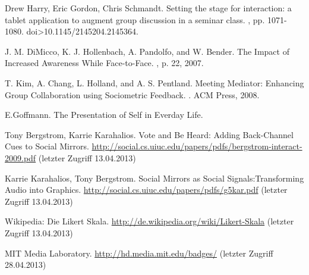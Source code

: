 \documentclass{seminarvorlage}
\begin{document}
\begin{thebibliography}{1}

Drew Harry, Eric Gordon, Chris Schmandt.
\newblock Setting the stage for interaction: a tablet application to augment group discussion in a seminar class. 
, pp. 1071-1080. doi>10.1145/2145204.2145364. 

J. M. DiMicco, K. J. Hollenbach, A. Pandolfo, and W. Bender.
\newblock The Impact of Increased Awareness While Face-to-Face.
, p. 22, 2007.

T. Kim, A. Chang, L. Holland, and A. S. Pentland.
\newblock Meeting Mediator: Enhancing Group Collaboration using Sociometric Feedback. 
. ACM Press, 2008.

E.Goffmann.
\newblock The Presentation of Self in Everday Life.

Tony Bergstrom, Karrie Karahalios. 
\newblock Vote and Be Heard: Adding Back-Channel Cues to Social Mirrors.
 \url {http://social.cs.uiuc.edu/papers/pdfs/bergstrom-interact-2009.pdf} (letzter Zugriff 13.04.2013)

Karrie Karahalios, Tony Bergstrom. 
\newblock Social Mirrors as Social Signals:Transforming Audio into Graphics.
 \url {http://social.cs.uiuc.edu/papers/pdfs/g5kar.pdf} (letzter Zugriff 13.04.2013)

Wikipedia: Die Likert Skala.
\newblock \url {http://de.wikipedia.org/wiki/Likert-Skala} (letzter Zugriff 13.04.2013)

 MIT Media Laboratory. 
\newblock \url {http://hd.media.mit.edu/badges/} (letzter Zugriff 28.04.2013)

\end{thebibliography}
\end{document}
